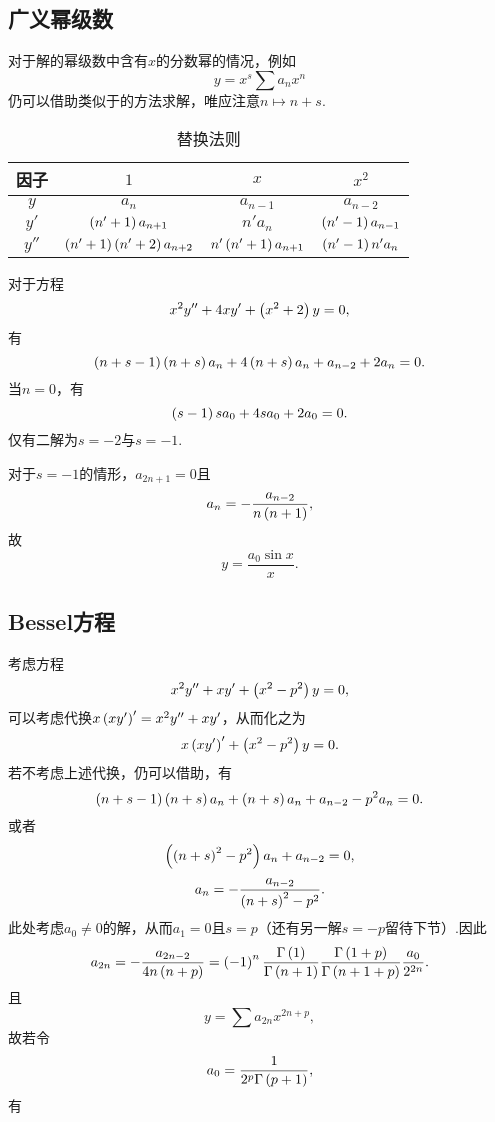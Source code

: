 \documentclass[UTF-8]{ctexart}
\begin{document}
  \subsection{广义幂级数}
  对于解的幂级数中含有$x$的分数幂的情况，例如
  \[ y = x^s \sum a_n x^n \]
  仍可以借助类似于的方法求解，唯应注意$n\mapsto n+s$.
  \begin{table}[!ht]
  \centering
    \begin{tabular}{|c|c|c|c|}
    \hline
    因子 & $1$ & $x$ & $x^2$ \\
    \hline
    $y$ & $a_n$ & $a_{n-1}$ & $a_{n-2}$ \\
    \hline
    $y'$ & $\left(n'+1\right)a_{n+1}$ & $n'a_n$ & $\left(n'-1\right)a_{n-1}$ \\
    \hline
    $y''$ & $\left(n'+1\right)\left(n'+2\right)a_{n+2}$ & $n'\left(n'+1\right)a_{n+1}$ & $\left(n'-1\right)n'a_n$ \\
    \hline
    \end{tabular}
    \caption{替换法则}
    \label{table:substs}
  \end{table}
  \begin{ex}
    对于方程
    \[ x^2y''+4xy' + \left(x^2+2\right)y=0, \]
    有
    \[ \left(n+s-1\right)\left(n+s\right)a_n + 4\left(n+s\right)a_n + a_{n-2} + 2a_n = 0. \]
    当$n=0$，有
    \[ \left(s-1\right)sa_0 + 4sa_0 + 2a_0 = 0. \]
    仅有二解为$s=-2$与$s=-1$.
    \par
    对于$s=-1$的情形，$a_{2n+1}=0$且
    \[ a_n = -\frac{a_{n-2}}{n\left(n+1\right)}, \]
    故
    \[ y = \frac{a_0\sin x}{x}. \]
  \end{ex}
  \subsection{Bessel方程}
  考虑方程
  \[ x^2y''+xy'+\left(x^2-p^2\right)y = 0, \]
  可以考虑代换$x\left(xy'\right)' = x^2y'' + xy'$，从而化之为
  \[ x\left(xy'\right)' + \left(x^2-p^2\right)y = 0. \]
  若不考虑上述代换，仍可以借助，有
  \[ \left(n+s-1\right)\left(n+s\right)a_n + \left(n+s\right)a_n + a_{n-2} - p^2a_n = 0. \]
  或者
  \[ \left(\left(n+s\right)^2-p^2\right)a_n + a_{n-2} = 0, \]
  \[ a_n = -\frac{a_{n-2}}{\left(n+s\right)^2-p^2}. \]
  此处考虑$a_0\ne 0$的解，从而$a_1 = 0$且$s=p$（还有另一解$s=-p$留待下节）.因此
  \[ a_{2n} = -\frac{a_{2n-2}}{4n\left(n+p\right)} = \left(-1\right)^n\frac{\Gamma\left(1\right)}{\Gamma\left(n+1\right)}\frac{\Gamma\left(1+p\right)}{\Gamma\left(n+1+p\right)}\frac{a_0}{2^{2n}}. \]
  且
  \[ y = \sum a_{2n}x^{2n+p}, \]
  故若令
  \[ a_0 = \frac{1}{2^p\Gamma\left(p+1\right)}, \]
  有
\end{document}
